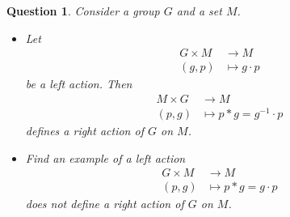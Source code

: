 \theoremstyle{plain}\newtheorem{exercise}{Question}
\nosectionnumbers

\begin{exercise}
    Consider a group $G$ and a set $M$.
    \begin{itemize}
        \item Let
        \begin{align}
            G\times M &\to M \\
            (g,p) &\mapsto g\cdot p
        \end{align}
        be a left action. Then
        \begin{align}
            M\times G &\to M \\
            (p,g) &\mapsto p*g=g^{-1}\cdot p
        \end{align}
        defines a right action of $G$ on $M$.

        \item Find an example of a left action
        \begin{align}
            G\times M &\to M \\
            (p,g) &\mapsto p*g=g\cdot p
        \end{align}
        does \emph{not} define a right action of $G$ on $M$.
    \end{itemize}
\end{exercise}

